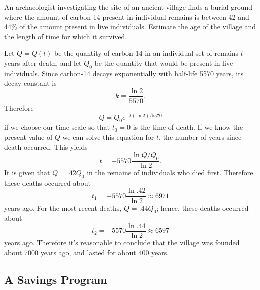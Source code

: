 \documentclass{ximera}
\begin{document}
\begin{example}\label{example:4.1.5}
An archaeologist investigating the site of an ancient village finds a
burial ground where the amount of carbon-14 present in individual
remains is between 42 and 44\% of the amount present in live
individuals. Estimate the age of the village and the length of time
for which it survived.
\begin{explanation}
Let $Q=Q(t)$ be the quantity of carbon-14 in an individual
set of remains $t$ years after death, and let $Q_0$ be the quantity
that would be present in  live individuals.
Since carbon-14 decays exponentially with half-life 5570 years, its
decay constant is
$$
k=\frac{\ln2}{5570}.
$$
 Therefore
$$
Q=Q_0e^{-t(\ln2)/5570}
$$
 if we choose our time scale so that $t_0=0$ is the
time of death.  If we know the present value of $Q$  we
can solve this equation for $t$, the number of years since
death occurred.  This yields
$$
t=-5570 \frac{\ln Q/Q_0}{\ln2}.
$$
It is given that $Q=.42Q_0$ in the remains of individuals who died
first. Therefore these deaths occurred about
$$
t_1=-5570 \frac{\ln .42}{\ln2} \approx 6971
$$
 years ago.  For the most recent deaths, $Q=.44
Q_0$; hence, these deaths occurred about
$$
t_2=-5570 \frac{\ln .44}{\ln2} \approx 6597
$$
 years ago.  Therefore it's reasonable to conclude
that the village was founded about 7000 years ago,
and lasted for about 400 years.
\end{explanation}
\end{example}

\subsection*{A Savings Program}
\end{document}
